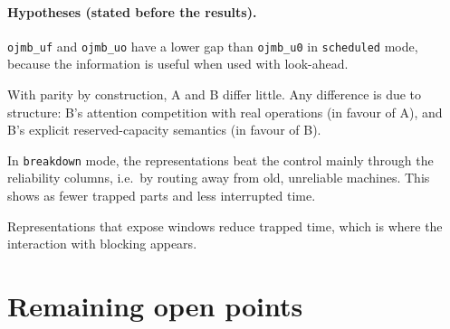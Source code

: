 \documentclass[11pt,a4paper]{article}
\newcommand{\code}[1]{\texttt{#1}}
\begin{document}
\paragraph{Hypotheses (stated before the results).}
\begin{description}[nosep]
  \item[H1] \code{ojmb\_uf} and \code{ojmb\_uo} have a lower gap than \code{ojmb\_u0} in
            \code{scheduled} mode, because the information is useful when used with look-ahead.
  \item[H2] With parity by construction, A and B differ little. Any difference is due to
            structure: B's attention competition with real operations (in favour of A), and B's
            explicit reserved-capacity semantics (in favour of B).
  \item[H3] In \code{breakdown} mode, the representations beat the control mainly through the
            reliability columns, i.e.\ by routing away from old, unreliable machines. This shows
            as fewer trapped parts and less interrupted time.
  \item[H4] Representations that expose windows reduce trapped time, which is where the
            interaction with blocking appears.
\end{description}

\section{Remaining open points}
\end{document}
